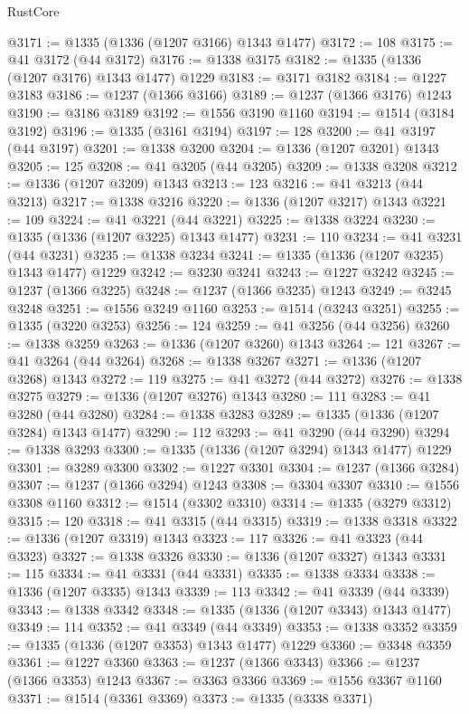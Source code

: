 \begin{lexlean}{RustCore}
\begin{coremodule}
@3171 := @1335 (@1336 (@1207 @3166) @1343 @1477)
@3172 := 108
@3175 := @41 @3172 (@44 @3172)
@3176 := @1338 @3175
@3182 := @1335 (@1336 (@1207 @3176) @1343 @1477) @1229
@3183 := @3171 @3182
@3184 := @1227 @3183
@3186 := @1237 (@1366 @3166)
@3189 := @1237 (@1366 @3176) @1243
@3190 := @3186 @3189
@3192 := @1556 @3190 @1160
@3194 := @1514 (@3184 @3192)
@3196 := @1335 (@3161 @3194)
@3197 := 128
@3200 := @41 @3197 (@44 @3197)
@3201 := @1338 @3200
@3204 := @1336 (@1207 @3201) @1343
@3205 := 125
@3208 := @41 @3205 (@44 @3205)
@3209 := @1338 @3208
@3212 := @1336 (@1207 @3209) @1343
@3213 := 123
@3216 := @41 @3213 (@44 @3213)
@3217 := @1338 @3216
@3220 := @1336 (@1207 @3217) @1343
@3221 := 109
@3224 := @41 @3221 (@44 @3221)
@3225 := @1338 @3224
@3230 := @1335 (@1336 (@1207 @3225) @1343 @1477)
@3231 := 110
@3234 := @41 @3231 (@44 @3231)
@3235 := @1338 @3234
@3241 := @1335 (@1336 (@1207 @3235) @1343 @1477) @1229
@3242 := @3230 @3241
@3243 := @1227 @3242
@3245 := @1237 (@1366 @3225)
@3248 := @1237 (@1366 @3235) @1243
@3249 := @3245 @3248
@3251 := @1556 @3249 @1160
@3253 := @1514 (@3243 @3251)
@3255 := @1335 (@3220 @3253)
@3256 := 124
@3259 := @41 @3256 (@44 @3256)
@3260 := @1338 @3259
@3263 := @1336 (@1207 @3260) @1343
@3264 := 121
@3267 := @41 @3264 (@44 @3264)
@3268 := @1338 @3267
@3271 := @1336 (@1207 @3268) @1343
@3272 := 119
@3275 := @41 @3272 (@44 @3272)
@3276 := @1338 @3275
@3279 := @1336 (@1207 @3276) @1343
@3280 := 111
@3283 := @41 @3280 (@44 @3280)
@3284 := @1338 @3283
@3289 := @1335 (@1336 (@1207 @3284) @1343 @1477)
@3290 := 112
@3293 := @41 @3290 (@44 @3290)
@3294 := @1338 @3293
@3300 := @1335 (@1336 (@1207 @3294) @1343 @1477) @1229
@3301 := @3289 @3300
@3302 := @1227 @3301
@3304 := @1237 (@1366 @3284)
@3307 := @1237 (@1366 @3294) @1243
@3308 := @3304 @3307
@3310 := @1556 @3308 @1160
@3312 := @1514 (@3302 @3310)
@3314 := @1335 (@3279 @3312)
@3315 := 120
@3318 := @41 @3315 (@44 @3315)
@3319 := @1338 @3318
@3322 := @1336 (@1207 @3319) @1343
@3323 := 117
@3326 := @41 @3323 (@44 @3323)
@3327 := @1338 @3326
@3330 := @1336 (@1207 @3327) @1343
@3331 := 115
@3334 := @41 @3331 (@44 @3331)
@3335 := @1338 @3334
@3338 := @1336 (@1207 @3335) @1343
@3339 := 113
@3342 := @41 @3339 (@44 @3339)
@3343 := @1338 @3342
@3348 := @1335 (@1336 (@1207 @3343) @1343 @1477)
@3349 := 114
@3352 := @41 @3349 (@44 @3349)
@3353 := @1338 @3352
@3359 := @1335 (@1336 (@1207 @3353) @1343 @1477) @1229
@3360 := @3348 @3359
@3361 := @1227 @3360
@3363 := @1237 (@1366 @3343)
@3366 := @1237 (@1366 @3353) @1243
@3367 := @3363 @3366
@3369 := @1556 @3367 @1160
@3371 := @1514 (@3361 @3369)
@3373 := @1335 (@3338 @3371)

\end{coremodule}
\end{lexlean}
